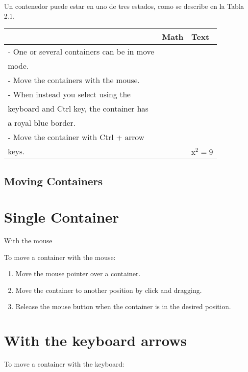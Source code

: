 Un contenedor puede estar en uno de tres estados, como se describe en la Tabla 2.1.



\begin{center}
\begin{tabular}{|l|l|l|}
\hline
 & Math & Text \\
\hline
- One or several containers can be in move &  &  \\
mode. &  &  \\
- Move the containers with the mouse. &  &  \\
- When instead you select using the &  &  \\
keyboard and Ctrl key, the container has &  &  \\
a royal blue border. &  &  \\
- Move the container with Ctrl + arrow &  &  \\
keys. &  & $\mathrm{x}^{2}=9$ \\
\hline
\end{tabular}
\end{center}

\subsection{Moving Containers}
\section{Single Container}
With the mouse

To move a container with the mouse:

\begin{enumerate}
  \item Move the mouse pointer over a container.

  \item Move the container to another position by click and dragging.

  \item Release the mouse button when the container is in the desired position.

\end{enumerate}

\section{With the keyboard arrows}
To move a container with the keyboard:

